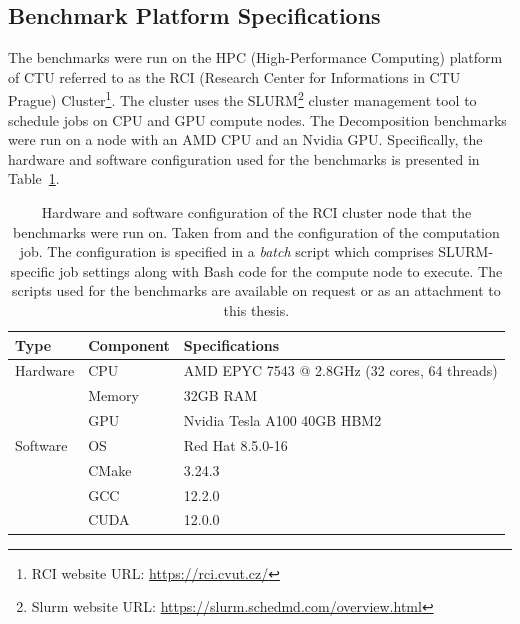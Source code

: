 \subsection{Benchmark Platform Specifications}\label{Subsection:comparing-decomposers-and-solvers->decomposition-project-benchmarks->benchmark-platform-specifications}
The benchmarks were run on the HPC (High-Performance Computing) platform of CTU referred to as the RCI (Research Center for Informations in CTU Prague) Cluster\footnote{RCI website URL: \url{https://rci.cvut.cz/}}.
The cluster uses the SLURM\footnote{Slurm website URL: \url{https://slurm.schedmd.com/overview.html}} cluster management tool to schedule jobs on CPU and GPU compute nodes.
The Decomposition benchmarks were run on a node with an AMD CPU and an Nvidia GPU.
Specifically, the hardware and software configuration used for the benchmarks is presented in Table~\ref{Table:comparing-decomposers-and-solvers->decomposition-project-benchmarks->benchmark-platform-specifications->RCI-node-hardware-software-specifications}.

\begin{table}[ht!]
	\centering
	\begin{tabular}{|l|l|l|}
		\hline
		\rowcolor[HTML]{C0C0C0} \textbf{Type} & \textbf{Component} & \textbf{Specifications}      \\ \hline
		Hardware                         & CPU    & AMD EPYC 7543 @ 2.8GHz (32 cores, 64 threads) \\
		                                 & Memory & 32GB RAM                                      \\
		                                 & GPU    & Nvidia Tesla A100 40GB HBM2                   \\ \hline
		\rowcolor[HTML]{EFEFEF} Software & OS     & Red Hat 8.5.0-16                              \\
		\rowcolor[HTML]{EFEFEF}          & CMake  & 3.24.3                                        \\
		\rowcolor[HTML]{EFEFEF}          & GCC    & 12.2.0                                        \\
		\rowcolor[HTML]{EFEFEF}          & CUDA   & 12.0.0                                        \\ \hline
	\end{tabular}
	\caption{Hardware and software configuration of the RCI cluster node that the benchmarks were run on.
		Taken from  \cite{9V4RBlLGVAweD9V9} and the configuration of the computation job.
		The configuration is specified in a \textit{batch} script which comprises SLURM-specific job settings along with Bash code for the compute node to execute.
		The scripts used for the benchmarks are available on request or as an attachment to this thesis.
	}
	\label{Table:comparing-decomposers-and-solvers->decomposition-project-benchmarks->benchmark-platform-specifications->RCI-node-hardware-software-specifications}
\end{table}



